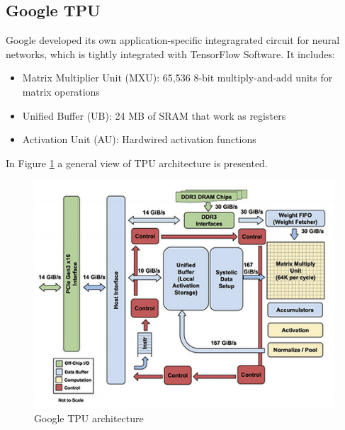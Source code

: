 \subsection{Google TPU}
Google developed its own application-specific integragrated circuit for neural networks, which is tightly integrated with TensorFlow Software.
It includes:
\begin{itemize}
\item Matrix Multiplier Unit (MXU): 65,536 8-bit multiply-and-add units for matrix operations
\item Unified Buffer (UB): 24 MB of SRAM that work as registers
\item Activation Unit (AU): Hardwired activation functions
\end{itemize}

In Figure \ref{fig:tpuarch} a general view of TPU architecture is presented.
\begin{figure}[H]
\centering
\captionsetup{justification=centering}
\includegraphics[scale=0.8]{./figure/tpu_arch.PNG}
\caption{Google TPU architecture\cite{paper:40}}
\label{fig:tpuarch}
\end{figure}

